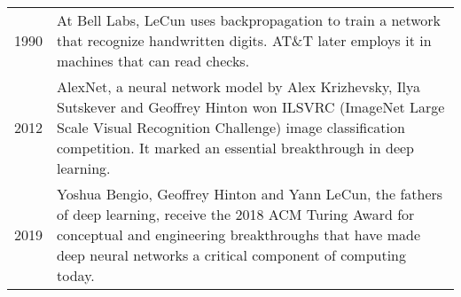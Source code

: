 \begin{table}
\begin{adjustwidth}{-1cm}{}
\begin{tabular}{@{\,}r <{\hskip 0pt} !{\foo} >{\raggedright\arraybackslash}p{14cm}}
1990 & At Bell Labs, LeCun uses backpropagation to train a network that recognize handwritten digits. AT\&T later employs it in machines that can read checks. \\


2012 &  AlexNet, a neural network model by Alex Krizhevsky, Ilya Sutskever and Geoffrey Hinton won ILSVRC (ImageNet Large Scale Visual Recognition Challenge) image classification competition. It marked an essential breakthrough in deep learning. \\

2019 & Yoshua Bengio, Geoffrey Hinton and Yann LeCun, the fathers of deep learning, receive the 2018 ACM Turing Award for conceptual and engineering breakthroughs that have made deep neural networks a critical component of computing today.

\end{tabular}
\end{adjustwidth}
\end{table}
